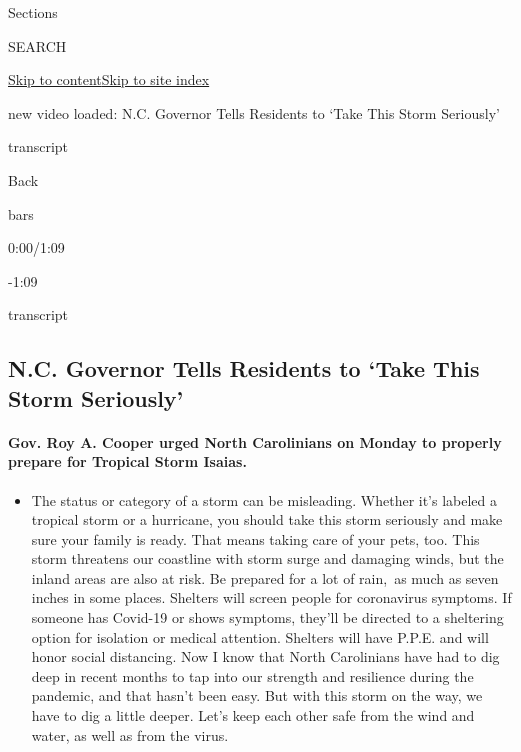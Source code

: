 Sections

SEARCH

\protect\hyperlink{site-content}{Skip to
content}\protect\hyperlink{site-index}{Skip to site index}

new video loaded: N.C. Governor Tells Residents to `Take This Storm
Seriously'

transcript

Back

bars

0:00/1:09

-1:09

transcript

\hypertarget{nc-governor-tells-residents-to-take-this-storm-seriously}{%
\subsection{N.C. Governor Tells Residents to `Take This Storm
Seriously'}\label{nc-governor-tells-residents-to-take-this-storm-seriously}}

\hypertarget{gov-roy-a-cooper-urged-north-carolinians-on-monday-to-properly-prepare-for-tropical-storm-isaias}{%
\paragraph{Gov. Roy A. Cooper urged North Carolinians on Monday to
properly prepare for Tropical Storm
Isaias.}\label{gov-roy-a-cooper-urged-north-carolinians-on-monday-to-properly-prepare-for-tropical-storm-isaias}}

\begin{itemize}
\tightlist
\item
  The status or category of a storm can be misleading. Whether it's
  labeled a tropical storm or a hurricane, you should take this storm
  seriously and make sure your family is ready. That means taking care
  of your pets, too. This storm threatens our coastline with storm surge
  and damaging winds, but the inland areas are also at risk. Be prepared
  for a lot of rain,~as much as seven inches in some places. Shelters
  will screen people for coronavirus symptoms. If someone has Covid-19
  or shows symptoms, they'll be directed to a sheltering option for
  isolation or medical attention. Shelters will have P.P.E. and will
  honor social distancing. Now I know that North Carolinians have had to
  dig deep in recent months to tap into our strength and resilience
  during the pandemic, and that hasn't been easy. But with this storm on
  the way, we have to dig a little deeper. Let's keep each other safe
  from the wind and water, as well as from the virus.
\end{itemize}

